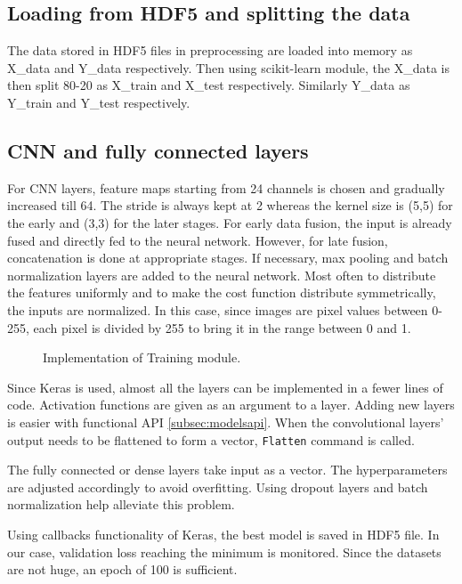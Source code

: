 \subsection{Loading from HDF5 and splitting the data}
The data stored in HDF5 files in preprocessing are loaded into memory as X\_data and
Y\_data respectively. Then using scikit-learn module, the X\_data is then split 80-20
as X\_train and X\_test respectively. Similarly Y\_data as Y\_train and Y\_test respectively.

\subsection{CNN and fully connected layers}
For CNN layers, feature maps starting from 24 channels is chosen and gradually increased till 64.
The stride is always kept at 2 whereas the kernel size is (5,5) for the early and
(3,3) for the later stages. For early data fusion, the input is already fused and directly
fed to the neural network. However, for late fusion, concatenation is done at appropriate
stages. If necessary, max pooling and batch normalization layers are added to the neural
network. Most often to distribute the features uniformly and to make the cost function
distribute symmetrically, the inputs are normalized. In this case, since images are pixel
values between 0-255, each pixel is divided by 255 to bring it in the range between 0 and
1.
\begin{figure}
    \centering
        \def\svgwidth{1.05\textwidth}
    \caption{Implementation of Training module.}
    \label{fig:trainingmodule}
\end{figure}

Since Keras is used, almost all the layers can be implemented in a fewer lines of code.
Activation functions are given as an argument to a layer. Adding new layers is easier with
functional API \ref{subsec:modelsapi}. When the convolutional layers' output needs to be
flattened to form a vector, \texttt{Flatten} command is called.

The fully connected or dense layers take input as a vector. The hyperparameters are
adjusted accordingly to avoid overfitting. Using dropout layers and batch normalization
help alleviate this problem.

Using callbacks functionality of Keras, the best model is saved in HDF5 file. In our case, validation
loss  reaching the minimum is monitored. Since the datasets are not huge, an epoch of 100
is sufficient.


